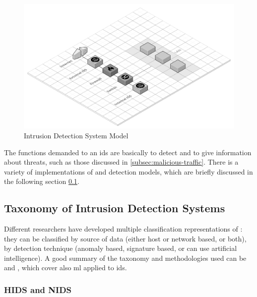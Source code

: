 \begin{figure}[h!]
        \centering
        \includegraphics[scale=0.2]{assets/figures/chapter2/Intrusion Detection System Model.png}
        \caption{Intrusion Detection System Model}
        \label{fig:IDS-model}
\end{figure}
\noindent The functions demanded to an \gls{ids} are basically to detect and to give information about threats, such as those discussed in \ref{subsec:malicious-traffic}. There is a variety of implementations of  and detection models, which are briefly discussed in the following section \ref{subsec:taxonomy-ids}.



\subsection{Taxonomy of Intrusion Detection Systems}
\label{subsec:taxonomy-ids}

Different researchers have developed multiple classification representations of : they can be classified by source of data (either host or network based, or both), by detection technique (anomaly based, signature based, or can use artificial intelligence). A good summary of the taxonomy and methodologies used can be \cite{Hodo2017} and \cite{Liu2019}, which cover also \gls{ml} applied to \gls{ids}.

\subsubsection{HIDS and NIDS}
\label{subsubsec:hids-nids}

